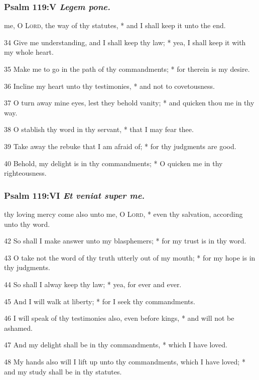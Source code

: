 \subsubsection{Psalm 119:V \textit{Legem pone.}}
 me, O \textsc{Lord}, the way of thy statutes, * and I shall keep it unto the end.
\par
    34 Give me understanding, and I shall keep thy law; * yea, I shall keep it with my whole heart.
\par
    35 Make me to go in the path of thy commandments; * for therein is my desire.
\par
    36 Incline my heart unto thy testimonies, * and not to covetousness.
\par
    37 O turn away mine eyes, lest they behold vanity; * and quicken thou me in thy way.
\par
    38 O stablish thy word in thy servant, * that I may fear thee.
\par
    39 Take away the rebuke that I am afraid of; * for thy judgments are good.
\par
    40 Behold, my delight is in thy commandments; * O quicken me in thy righteousness.
    \subsubsection{Psalm 119:VI \textit{Et veniat super me.}}
 thy loving mercy come also unto me, O \textsc{Lord}, * even thy salvation, according unto thy word.
\par
    42 So shall I make answer unto my blasphemers; * for my trust is in thy word.
\par
    43 O take not the word of thy truth utterly out of my mouth; * for my hope is in thy judgments.
\par
    44 So shall I alway keep thy law; * yea, for ever and ever.
\par
    45 And I will walk at liberty; * for I seek thy commandments.
\par
    46 I will speak of thy testimonies also, even before kings, * and will not be ashamed.
\par
    47 And my delight shall be in thy commandments, * which I have loved.
\par
    48 My hands also will I lift up unto thy commandments, which I have loved; * and my study shall be in thy statutes.
